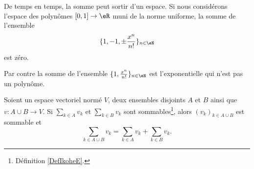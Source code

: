 \begin{example}
	De temps en temps, la somme peut sortir d'un espace. Si nous considérons l'espace des polynômes \( \mathopen[ 0 , 1 \mathclose]\to \eR\) muni de la norme uniforme, la somme de l'ensemble
	\begin{equation}
		\{ 1,-1,\pm\frac{ x^n }{ n! } \}_{n\in \eN}
	\end{equation}
	est zéro.

	Par contre la somme de l'ensemble \( \{ 1,\frac{ x^n }{ n! } \}_{n\in \eN}\) est l'exponentielle qui n'est pas un polynôme.
\end{example}

\begin{proposition}      \label{PROPooJLQAooAEbIvZ}
	Soient un espace vectoriel normé \( V\), deux ensembles disjoints \( A\) et \( B\) ainsi que \( v\colon A\cup B\to V\). Si \( \sum_{k\in A}v_k\) et \( \sum_{k\in B}v_k\) sont sommables\footnote{Définition \ref{DefIkoheE}.}, alors \( (v_k)_{k\in A\cup B}\) est sommable et
	\begin{equation}
		\sum_{k\in A\cup B}v_k=\sum_{k\in A}v_k+\sum_{k\in B}v_k.
	\end{equation}
\end{proposition}

